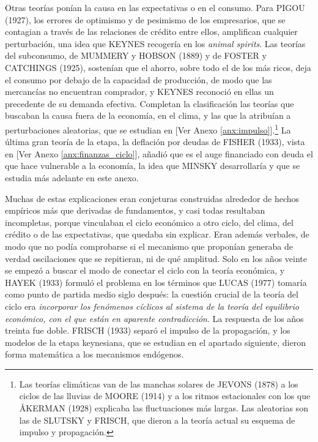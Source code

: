 \documentclass[10pt,a4paper]{article}
\newcommand{\authorfont}[1]{{\fontfamily{EBGaramond-TLF}\selectfont #1}}
\newcounter{anexo}
\begin{document}
Otras teorías ponían la causa en las expectativas o en el consumo. Para PIGOU (1927), los errores de optimismo y de pesimismo de los empresarios, que se contagian a través de las relaciones de crédito entre ellos, amplifican cualquier perturbación, una idea que KEYNES recogería en los \textit{animal spirits}. Las teorías del subconsumo, de MUMMERY y HOBSON (1889) y de FOSTER y CATCHINGS (1925), sostenían que el ahorro, sobre todo el de los más ricos, deja el consumo por debajo de la capacidad de producción, de modo que las mercancías no encuentran comprador, y KEYNES reconoció en ellas un precedente de su demanda efectiva. Completan la clasificación las teorías que buscaban la causa fuera de la economía, en el clima, y las que la atribuían a perturbaciones aleatorias, que se estudian en [\authorfont{Ver Anexo \ref{anx:impulso}}].\footnote{%
    Las teorías climáticas van de las manchas solares de JEVONS (1878) a los ciclos de las lluvias de MOORE (1914) y a los ritmos estacionales con los que ÅKERMAN (1928) explicaba las fluctuaciones más largas. Las aleatorias son las de SLUTSKY y FRISCH, que dieron a la teoría actual su esquema de impulso y propagación.
}
La última gran teoría de la etapa, la deflación por deudas de FISHER (1933), vista en [\authorfont{Ver Anexo \ref{anx:finanzas_ciclo}}], añadió que es el auge financiado con deuda el que hace vulnerable a la economía, la idea que MINSKY desarrollaría y que se estudia más adelante en este anexo.

Muchas de estas explicaciones eran conjeturas construidas alrededor de hechos empíricos más que derivadas de fundamentos, y casi todas resultaban incompletas, porque vinculaban el ciclo económico a otro ciclo, del clima, del crédito o de las expectativas, que quedaba sin explicar. Eran además verbales, de modo que no podía comprobarse si el mecanismo que proponían generaba de verdad oscilaciones que se repitieran, ni de qué amplitud. Solo en los años veinte se empezó a buscar el modo de conectar el ciclo con la teoría económica, y HAYEK (1933) formuló el problema en los términos que LUCAS (1977) tomaría como punto de partida medio siglo después: la cuestión crucial de la teoría del ciclo era \textit{incorporar los fenómenos cíclicos al sistema de la teoría del equilibrio económico, con el que están en aparente contradicción}. La respuesta de los años treinta fue doble. FRISCH (1933) separó el impulso de la propagación, y los modelos de la etapa keynesiana, que se estudian en el apartado siguiente, dieron forma matemática a los mecanismos endógenos.
\end{document}
